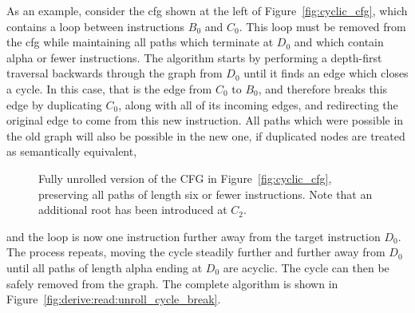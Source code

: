 As an example, consider the \gls{cfg} shown at the left of
Figure~\ref{fig:cyclic_cfg}, which contains a loop between
instructions $B_0$ and $C_0$.  This loop must be removed from the
\gls{cfg} while maintaining all paths which terminate at $D_0$ and
which contain \gls{alpha} or fewer instructions.  The algorithm starts
by performing a depth-first traversal backwards through the graph from
$D_0$ until it finds an edge which closes a cycle.  In this case, that
is the edge from $C_0$ to $B_0$, and {\technique} therefore breaks
this edge by duplicating $C_0$, along with all of its incoming edges,
and redirecting the original edge to come from this new instruction.
All paths which were possible in the old graph will also be possible
in the new one, if duplicated nodes are treated as semantically
equivalent,
\begin{wrapfigure}{O}{3.9cm}
\vspace{-8pt}
\begin{figgure}
\caption{Fully unrolled version of the CFG in
  Figure~\ref{fig:cyclic_cfg}, preserving all paths of length six or
  fewer instructions.  Note that an additional root has been
  introduced at $C_2$. }
\label{fig:unrolled_cyclic_cfg}
\end{figgure}
\vspace{-20pt}
\end{wrapfigure}
and the loop is now one instruction further away from the target
instruction $D_0$.  The process repeats, moving the cycle steadily
further and further away from $D_0$ until all paths of length
\gls{alpha} ending at $D_0$ are acyclic.  The cycle can then be safely
removed from the graph.  The complete algorithm is shown in
Figure~\ref{fig:derive:read:unroll_cycle_break}.

